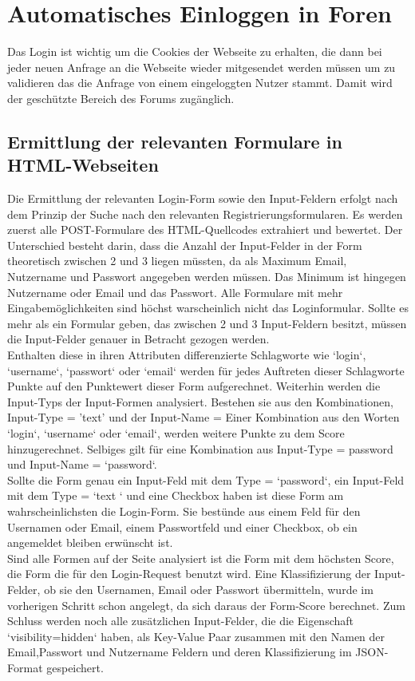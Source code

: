 \section {Automatisches Einloggen in Foren}
Das Login ist wichtig um die Cookies der Webseite zu erhalten, die dann bei jeder neuen Anfrage an die Webseite wieder mitgesendet werden müssen um zu validieren das die Anfrage von einem eingeloggten Nutzer stammt. Damit wird der geschützte Bereich des Forums zugänglich.
\subsection{Ermittlung der relevanten Formulare in HTML-Webseiten}
Die Ermittlung der relevanten Login-Form sowie den Input-Feldern erfolgt nach dem Prinzip der Suche nach den relevanten Registrierungsformularen. Es werden zuerst alle POST-Formulare des HTML-Quellcodes extrahiert und bewertet. Der Unterschied besteht darin, dass die Anzahl der Input-Felder in der Form theoretisch zwischen 2 und 3 liegen müssten, da als Maximum Email, Nutzername und Passwort angegeben werden müssen. Das Minimum ist hingegen Nutzername oder Email und das Passwort. Alle Formulare mit mehr Eingabemöglichkeiten sind höchst warscheinlich nicht das Loginformular.
Sollte es mehr als ein Formular geben, das zwischen 2 und 3 Input-Feldern besitzt, müssen die Input-Felder genauer in Betracht gezogen werden. \\
Enthalten diese in ihren Attributen differenzierte Schlagworte wie `login`, `username`, `passwort` oder `email` werden für jedes Auftreten dieser Schlagworte Punkte auf den Punktewert dieser Form aufgerechnet. Weiterhin werden die Input-Typs der Input-Formen analysiert. Bestehen sie aus den Kombinationen, Input-Type = 'text' und der Input-Name = Einer Kombination aus den Worten `login`, `username` oder `email`, werden weitere Punkte zu dem Score hinzugerechnet. Selbiges gilt für eine Kombination aus Input-Type = password und Input-Name = `password`.\\
Sollte die Form genau ein Input-Feld mit dem Type = `password`, ein Input-Feld mit dem Type = `text ` und eine Checkbox haben ist diese Form am wahrscheinlichsten die Login-Form. Sie bestünde aus einem Feld für den Usernamen oder Email, einem Passwortfeld und einer Checkbox, ob ein angemeldet bleiben erwünscht ist.\\
Sind alle Formen auf der Seite analysiert ist die Form mit dem höchsten Score, die Form die für den Login-Request benutzt wird. Eine Klassifizierung der Input-Felder, ob sie den Usernamen, Email oder Passwort übermitteln, wurde im vorherigen Schritt schon angelegt, da sich daraus der Form-Score berechnet. Zum Schluss werden noch alle zusätzlichen Input-Felder, die die Eigenschaft `visibility=hidden` haben, als Key-Value Paar zusammen mit den Namen der Email,Passwort und Nutzername Feldern und deren Klassifizierung im JSON-Format gespeichert.
